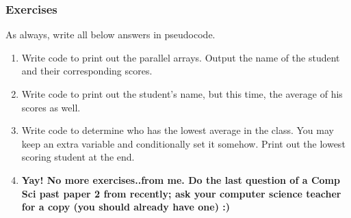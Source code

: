\documentclass[./main.tex]{subfiles}
\begin{document}
\subsubsection{Exercises}

As always, write all below answers in pseudocode.

\begin{enumerate}
    \item Write code to print out the parallel arrays. Output the name of the student and their corresponding scores.
        \verylargelines
    \item Write code to print out the student's name, but this time, the average of his scores as well.
        \verylargelines
    \item Write code to determine who has the lowest average in the class. You may keep an extra variable and conditionally set it somehow. Print out the lowest scoring student at the end.
        \verylargelines
    \item \textbf{Yay! No more exercises..from me. Do the last question of a Comp Sci past paper 2 from recently; ask your computer science teacher for a copy (you should already have one) :)}
\end{enumerate}
\end{document}
